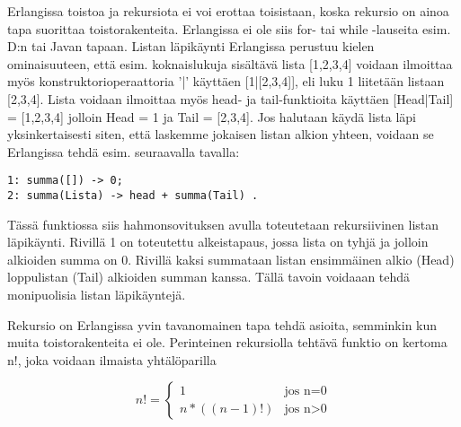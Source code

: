 \documentclass[11pt,oneside,a4paper]{article}
\begin{document}
Erlangissa toistoa ja rekursiota ei voi erottaa toisistaan, koska rekursio on ainoa tapa suorittaa toistorakenteita. Erlangissa ei ole siis for- tai while -lauseita esim. D:n tai Javan tapaan. Listan läpikäynti Erlangissa perustuu kielen ominaisuuteen, että
esim. koknaislukuja sisältävä lista [1,2,3,4]  voidaan ilmoittaa myös konstruktorioperaattoria '|' käyttäen [1|[2,3,4]], eli luku 1 liitetään listaan [2,3,4]. Lista voidaan ilmoittaa myös head- ja tail-funktioita käyttäen [Head|Tail] = [1,2,3,4] jolloin Head = 1 ja Tail = [2,3,4].
Jos halutaan käydä lista läpi yksinkertaisesti siten, että laskemme jokaisen listan alkion yhteen, voidaan se Erlangissa tehdä esim. seuraavalla tavalla:

\begin{verbatim}
1: summa([]) -> 0;
2: summa(Lista) -> head + summa(Tail) .  
\end{verbatim}


Tässä funktiossa siis hahmonsovituksen avulla toteutetaan rekursiivinen listan läpikäynti. Rivillä 1 on toteutettu alkeistapaus, jossa lista on tyhjä ja jolloin alkioiden summa on 0. Rivillä kaksi summataan listan ensimmäinen alkio (Head) loppulistan 
(Tail) alkioiden summan kanssa. Tällä tavoin voidaaan tehdä monipuolisia listan läpikäyntejä. 

Rekursio on Erlangissa yvin tavanomainen tapa tehdä asioita, semminkin kun muita toistorakenteita ei ole. Perinteinen rekursiolla tehtävä funktio on kertoma n!, joka voidaan ilmaista yhtälöparilla 

\begin{displaymath}
n! = \left\{ \begin{array}{ll}
1 & \textrm{jos n=0}\\
n*((n-1)!) & \textrm{{jos n>0}}
\end{array} \right.
\end{displaymath}
\end{document}
